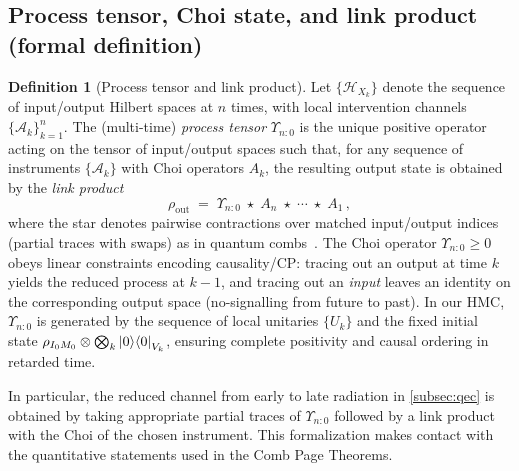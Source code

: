 \documentclass[a4paper,11pt]{article}
\newcommand{\HMC}{\textsc{HMC}\xspace}
\theoremstyle{plain}
\theoremstyle{definition}
\newtheorem{definition}{Definition}
\theoremstyle{remark}
\begin{document}
\subsection{Process tensor, Choi state, and link product (formal definition)}
\label{subsec:process-tensor-def}
\begin{definition}[Process tensor and link product]
Let $\{\mathcal{H}_{X_k}\}$ denote the sequence of input/output Hilbert spaces at $n$ times, with local intervention channels $\{\mathcal{A}_k\}_{k=1}^n$. The (multi-time) \emph{process tensor} $\Upsilon_{n{:}0}$ is the unique positive operator acting on the tensor of input/output spaces such that, for any sequence of instruments $\{\mathcal{A}_k\}$ with Choi operators $A_k$, the resulting output state is obtained by the \emph{link product}
\begin{equation}
\rho_{\mathrm{out}} \;=\; \Upsilon_{n{:}0} \;\star\; A_n \;\star\; \cdots \;\star\; A_1 \,,
\end{equation}
where the star denotes pairwise contractions over matched input/output indices (partial traces with swaps) as in quantum combs~\cite{Chiribella:2009}. The Choi operator $\Upsilon_{n{:}0}\ge 0$ obeys linear constraints encoding causality/CP: tracing out an output at time $k$ yields the reduced process at $k{-}1$, and tracing out an \emph{input} leaves an identity on the corresponding output space (no-signalling from future to past). In our \HMC{}, $\Upsilon_{n{:}0}$ is generated by the sequence of local unitaries $\{U_k\}$ and the fixed initial state $\rho_{I_0M_0}\otimes\bigotimes_k \left|0\right\rangle\!\left\langle0\right|_{V_k}$, ensuring complete positivity and causal ordering in retarded time.
\end{definition}
In particular, the reduced channel from early to late radiation in \cref{subsec:qec} is obtained by taking appropriate partial traces of $\Upsilon_{n{:}0}$ followed by a link product with the Choi of the chosen instrument. This formalization makes contact with the quantitative statements used in the Comb Page Theorems.
\end{document}
